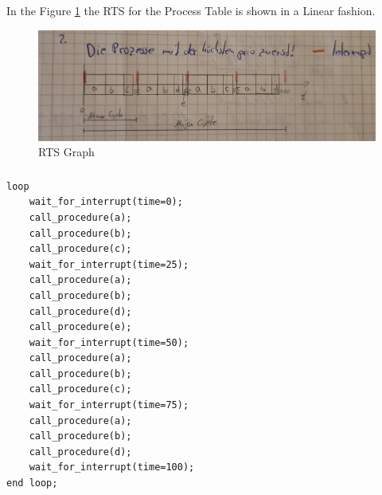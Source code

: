 \documentclass{article}
\begin{document}
\subsubsection{}
In the Figure \ref{fig:Bild1} the RTS for the Process Table is shown in a Linear fashion.
\begin{figure}[H] 
  \centering
     \includegraphics[width=1\textwidth]{RTS.jpg}
  \caption{RTS Graph}
  \label{fig:Bild1}
\end{figure}

\subsubsection{}
\begin{lstlisting}
loop
	wait_for_interrupt(time=0);
	call_procedure(a);
	call_procedure(b);
	call_procedure(c);
	wait_for_interrupt(time=25);
	call_procedure(a);
	call_procedure(b);
	call_procedure(d);
	call_procedure(e);
	wait_for_interrupt(time=50);
	call_procedure(a);
	call_procedure(b);
	call_procedure(c);
	wait_for_interrupt(time=75);
	call_procedure(a);
	call_procedure(b);
	call_procedure(d);
	wait_for_interrupt(time=100);
end loop;
\end{lstlisting}
\end{document}
